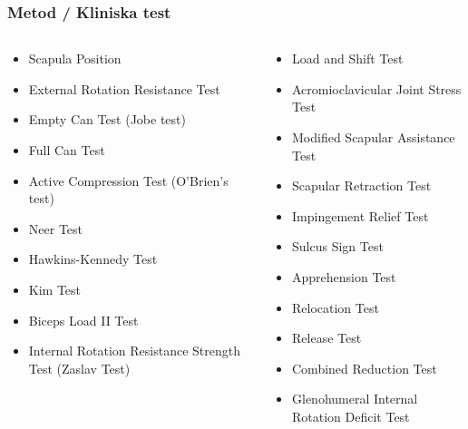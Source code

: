 \documentclass[aspectratio=169,12pt,handout,usenames,dvipsnames]{beamer}
\begin{document}
\begin{frame}
	\frametitle{Metod / Kliniska test}
	\begin{columns}
		\begin{column}{0.5\textwidth}
			\begin{itemize}
				\item Scapula Position
				\item External Rotation Resistance Test
				\item Empty Can Test (Jobe test)
				\item Full Can Test
				\item Active Compression Test (O’Brien’s test)
				\item Neer Test
				\item Hawkins-Kennedy Test
				\item Kim Test
				\item Biceps Load II Test
				\item Internal Rotation Resistance Strength Test (Zaslav Test)
			\end{itemize}
		\end{column}
		\begin{column}{0.5\textwidth}
			\begin{itemize}
				\item Load and Shift Test
				\item Acromioclavicular Joint Stress Test
				\item Modified Scapular Assistance Test
				\item Scapular Retraction Test
				\item Impingement Relief Test
				\item Sulcus Sign Test
				\item Apprehension Test
				\item Relocation Test
				\item Release Test
				\item Combined Reduction Test
				\item Glenohumeral Internal Rotation Deficit Test
			\end{itemize}
		\end{column}
	\end{columns}
\end{frame}
\end{document}
